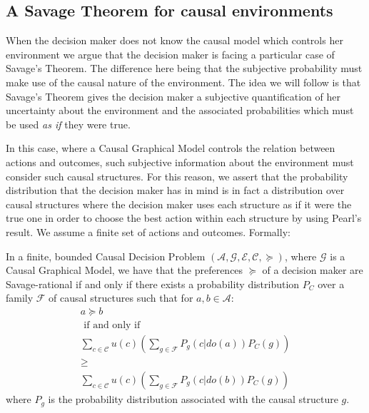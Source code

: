\documentclass{svjour3}                     %
\begin{document}
\subsection{A Savage Theorem for causal environments}
\label{section_savage}
When the decision maker does not know the causal model which controls her environment we argue that the decision maker is facing a particular case of Savage's Theorem. The difference here being that the subjective probability must make use of the causal nature of the environment. The idea we will follow is that Savage's Theorem gives the decision maker a subjective quantification of her uncertainty about the environment and the associated probabilities which must be used \textit{as if} they were true. 

In this case, where a Causal Graphical Model controls the relation between actions and outcomes, such subjective information about the environment must consider such causal structures. For this reason, we assert that the probability distribution that the decision maker has in mind is in fact a distribution over causal structures where the decision maker uses each structure as if it were the true one in order to choose the best action within each structure by using Pearl's result. We assume a finite set of actions and outcomes. Formally:

\begin{theorem}
\label{causal_savage}
In a finite, bounded Causal Decision Problem  $(\mathcal{A}, \mathcal{G},\mathcal{E},\mathcal{C},\succeq)$, where $\mathcal{G}$ is a Causal Graphical Model, we have that the preferences $\succeq$ of a decision maker are Savage-rational if and only if there exists a probability distribution $P_C$ over a family $\mathcal{F}$ of causal structures such that for $a,b \in \mathcal{A}$:
\begin{eqnarray*}
&a \succeq b&\\ 
&\textrm{ if and only if }&\\
&\sum_{c \in \mathcal{C}} u(c) \left( \sum_{g \in \mathcal{F}} P_g(c | do(a))P_C(g) \right)&\\
&\geq& \\
&\sum_{c \in \mathcal{C}}  u(c) \left( \sum_{g \in \mathcal{F}} P_g(c | do(b))P_C(g) \right)&
\end{eqnarray*}
where $P_g$ is the probability distribution associated with the causal structure $g$. 
\end{theorem}
\end{document}
